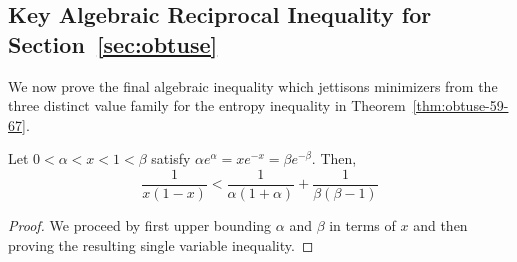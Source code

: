 \documentclass[11pt]{article}
\begin{document}
\subsection{Key Algebraic Reciprocal Inequality for Section~\ref{sec:obtuse}}\label{x:obtuse}
We now prove the final algebraic inequality which jettisons minimizers from the three distinct value family for the entropy inequality in Theorem~\ref{thm:obtuse-59-67}.
\begin{lemma}\label{lemma:obtuse-reciprocal}
    Let $0<\alpha<x<1<\beta$ satisfy $\alpha e^\alpha=xe^{-x}=\beta e^{-\beta}$. Then, 
    \begin{equation}
        \frac{1}{x(1-x)}<\frac{1}{\alpha(1+\alpha)}+\frac{1}{\beta(\beta-1)}
    \end{equation}
\end{lemma}
\begin{proof}
    We proceed by first upper bounding $\alpha$ and $\beta$ in terms of $x$ and then proving the resulting single variable inequality. 


\end{proof}
\end{document}
